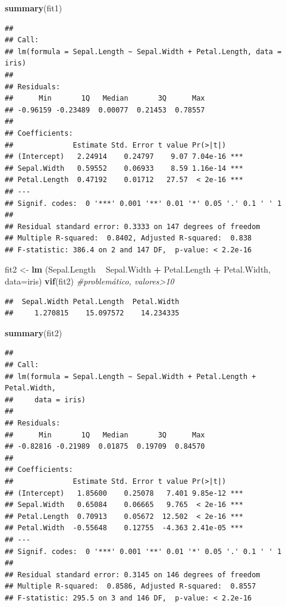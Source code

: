 \documentclass[
]{book}
\newenvironment{Shaded}{\begin{snugshade}}{\end{snugshade}}
\newcommand{\CommentTok}[1]{\textcolor[rgb]{0.56,0.35,0.01}{\textit{#1}}}
\newcommand{\DataTypeTok}[1]{\textcolor[rgb]{0.13,0.29,0.53}{#1}}
\newcommand{\KeywordTok}[1]{\textcolor[rgb]{0.13,0.29,0.53}{\textbf{#1}}}
\newcommand{\NormalTok}[1]{#1}
\newcommand{\OperatorTok}[1]{\textcolor[rgb]{0.81,0.36,0.00}{\textbf{#1}}}
\newcommand{\StringTok}[1]{\textcolor[rgb]{0.31,0.60,0.02}{#1}}
\begin{document}
\begin{Shaded}
\begin{Highlighting}[]
\KeywordTok{summary}\NormalTok{(fit1)}
\end{Highlighting}
\end{Shaded}

\begin{verbatim}
## 
## Call:
## lm(formula = Sepal.Length ~ Sepal.Width + Petal.Length, data = iris)
## 
## Residuals:
##      Min       1Q   Median       3Q      Max 
## -0.96159 -0.23489  0.00077  0.21453  0.78557 
## 
## Coefficients:
##              Estimate Std. Error t value Pr(>|t|)    
## (Intercept)   2.24914    0.24797    9.07 7.04e-16 ***
## Sepal.Width   0.59552    0.06933    8.59 1.16e-14 ***
## Petal.Length  0.47192    0.01712   27.57  < 2e-16 ***
## ---
## Signif. codes:  0 '***' 0.001 '**' 0.01 '*' 0.05 '.' 0.1 ' ' 1
## 
## Residual standard error: 0.3333 on 147 degrees of freedom
## Multiple R-squared:  0.8402, Adjusted R-squared:  0.838 
## F-statistic: 386.4 on 2 and 147 DF,  p-value: < 2.2e-16
\end{verbatim}

\begin{Shaded}
\begin{Highlighting}[]
\NormalTok{fit2 <-}\StringTok{ }\KeywordTok{lm}\NormalTok{ (Sepal.Length }\OperatorTok{~}\StringTok{ }\NormalTok{Sepal.Width }\OperatorTok{+}\StringTok{ }\NormalTok{Petal.Length }\OperatorTok{+}\StringTok{ }\NormalTok{Petal.Width, }\DataTypeTok{data=}\NormalTok{iris)}
\KeywordTok{vif}\NormalTok{(fit2) }\CommentTok{#problemático, valores>10}
\end{Highlighting}
\end{Shaded}

\begin{verbatim}
##  Sepal.Width Petal.Length  Petal.Width 
##     1.270815    15.097572    14.234335
\end{verbatim}

\begin{Shaded}
\begin{Highlighting}[]
\KeywordTok{summary}\NormalTok{(fit2)}
\end{Highlighting}
\end{Shaded}

\begin{verbatim}
## 
## Call:
## lm(formula = Sepal.Length ~ Sepal.Width + Petal.Length + Petal.Width, 
##     data = iris)
## 
## Residuals:
##      Min       1Q   Median       3Q      Max 
## -0.82816 -0.21989  0.01875  0.19709  0.84570 
## 
## Coefficients:
##              Estimate Std. Error t value Pr(>|t|)    
## (Intercept)   1.85600    0.25078   7.401 9.85e-12 ***
## Sepal.Width   0.65084    0.06665   9.765  < 2e-16 ***
## Petal.Length  0.70913    0.05672  12.502  < 2e-16 ***
## Petal.Width  -0.55648    0.12755  -4.363 2.41e-05 ***
## ---
## Signif. codes:  0 '***' 0.001 '**' 0.01 '*' 0.05 '.' 0.1 ' ' 1
## 
## Residual standard error: 0.3145 on 146 degrees of freedom
## Multiple R-squared:  0.8586, Adjusted R-squared:  0.8557 
## F-statistic: 295.5 on 3 and 146 DF,  p-value: < 2.2e-16
\end{verbatim}
\end{document}
